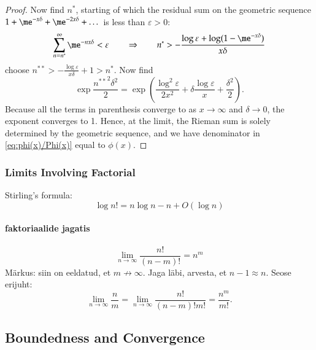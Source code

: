 \documentclass[a4paper]{article}
\numberwithin{equation}{subsection}
\begin{document}
\begin{proof}
  Now find $n^{*}$, starting of which the residual sum on the
  geometric sequence $1 + \me^{-x \delta} + \me^{-2 x \delta} + \dots$
  is less than $\varepsilon > 0$:
  \begin{equation*}
    \sum_{n=n^{*}}^{\infty} \me^{-n x \delta} < \varepsilon
    \qquad\Rightarrow\qquad
    n^{*} > -\frac{\log \varepsilon + \log(1 - \me^{-x \delta})}{x \delta}
  \end{equation*}
  choose $n^{**} > -\frac{\log \varepsilon}{x \delta} + 1 > n^{*}$.
  Now find 
  \begin{equation*}
    \exp\frac{{n^{**}}^{2} \delta^{2}}{2}
    =
    \exp\left(
      \frac{\log^{2}\varepsilon}{2 x^{2}}
      +
      \delta\frac{\log\varepsilon}{x}
      +
      \frac{\delta^{2}}{2}
    \right).
  \end{equation*}
  Because all the terms in parenthesis converge to as $x\to\infty$ and
  $\delta \to 0$, the exponent converges to 1.  Hence, at the limit, the
  Rieman sum is solely determined by the geometric sequence, and we
  have denominator in \eqref{eq:phi(x)/Phi(x)} equal to $\phi(x)$.
\end{proof}

\subsubsection{Limits Involving Factorial}
\label{sec:factorial}

Stirling's formula:
\begin{equation}
  \log n! = n \log n - n + O( \log n)
\end{equation}

\paragraph{faktoriaalide jagatis}
\begin{equation}
\lim_{n\to\infty} \frac{n! }{ (n-m)!} = n^m
\label{eq:faktoriaalide jagatis}
\end{equation}
Märkus: siin on eeldatud, et $m \not\to \infty$. Jaga läbi, arvesta, et
$n-1 \approx n$. Seose erijuht:
\begin{equation}
 \lim_{n\to\infty} \frac{n}{m} = \lim_{n\to\infty} \frac{n! }{ (n-m)! m!}
= \frac{n^m }{ m!}.
\end{equation}


\subsection{Boundedness and Convergence}
\label{sec:convergence}
\end{document}
